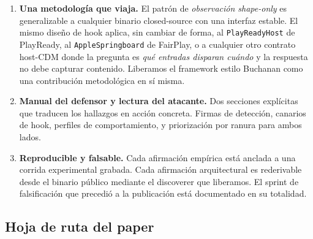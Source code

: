 \documentclass[11pt,letterpaper]{article}
\begin{document}
\begin{enumerate}[itemsep=4pt,topsep=2pt]
  \item \textbf{Una metodología que viaja.} El patrón de
        \emph{observación shape-only} es generalizable a cualquier
        binario closed-source con una interfaz estable. El mismo
        diseño de hook aplica, sin cambiar de forma, al
        \texttt{PlayReadyHost} de PlayReady, al
        \texttt{AppleSpringboard} de FairPlay, o a cualquier otro
        contrato host-CDM donde la pregunta es \emph{qué entradas
        disparan cuándo} y la respuesta no debe capturar
        contenido. Liberamos el framework estilo Buchanan como una
        contribución metodológica en sí misma.

  \item \textbf{Manual del defensor y lectura del atacante.} Dos
        secciones explícitas que traducen los hallazgos en acción
        concreta. Firmas de detección, canarios de hook, perfiles
        de comportamiento, y priorización por ranura para ambos
        lados.

  \item \textbf{Reproducible y falsable.} Cada afirmación empírica
        está anclada a una corrida experimental grabada. Cada
        afirmación arquitectural es rederivable desde el binario
        público mediante el discoverer que liberamos. El sprint de
        falsificación que precedió a la publicación está
        documentado en su totalidad.
\end{enumerate}

\subsection*{Hoja de ruta del paper}
\end{document}
